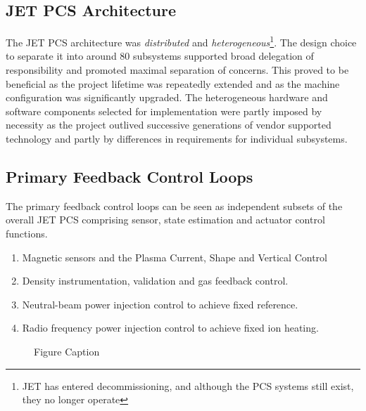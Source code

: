 \documentclass[preprint,12pt]{elsarticle}
\begin{document}
\subsection{JET PCS Architecture}

The JET PCS architecture was
{\em distributed} and {\em heterogeneous}\footnote{JET has entered decommissioning, and although the PCS systems still exist, they no longer operate}.  
The design choice to separate it into around 80 subsystems supported broad delegation of responsibility and
promoted maximal separation of concerns. This proved to be beneficial as the project lifetime was repeatedly extended and as the machine configuration was 
significantly upgraded.  The heterogeneous hardware and software components selected for implementation were partly imposed by necessity as the project outlived successive generations of vendor supported  technology and partly by differences in requirements for individual subsystems.




\subsection{Primary Feedback Control Loops}
\label{s_primary_fb}

The primary feedback control loops can be seen as independent subsets of the overall JET PCS
comprising sensor, state estimation and actuator control functions.

\begin{enumerate}
	\item{Magnetic sensors and the Plasma Current, Shape and Vertical Control}
	\item{Density instrumentation, validation and gas feedback control.}
	\item{Neutral-beam power injection control to achieve fixed reference.}
	\item{Radio frequency power injection control to achieve fixed ion heating.}
\end{enumerate}

\begin{figure}[t]%
\centering%
\vspace{1.5in}
\caption{Figure Caption}\label{fig1}
\end{figure}
\end{document}
